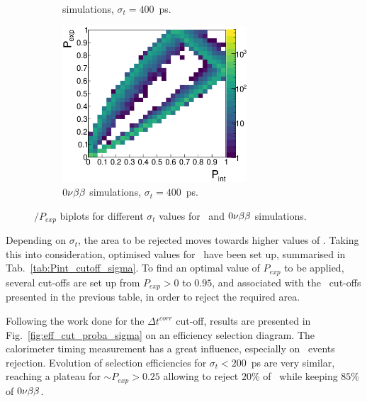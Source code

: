 \begin{figure}[!h]
\begin{subfigure}[t]{0.49\textwidth}
  \captionsetup{justification=justified}
  \caption{\Tl simulations, ${\sigma_{t}=400}$~ps.
    \label{subfig:}}
\end{subfigure}
\hfill
\begin{subfigure}[t]{0.49\textwidth}
  \centering
  \includegraphics[width=0.76\textwidth]{timedifference/fig_timediff/PintVSPexp_0nubb_400.eps}
  \captionsetup{justification=justified}
  \caption{$0\nu\beta\beta$ simulations, ${\sigma_{t}=400}$~ps.
    \label{subfig:}}
\end{subfigure}
\caption{\Pint$/P_{exp}$ biplots for different $\sigma_{t}$ values for \Tl\ and $0\nu\beta\beta$ simulations.
  \label{fig:biplot_Pexp_Pint_sigma}}
\end{figure}
Depending on $\sigma_{t}$, the area to be rejected moves towards higher values of \Pint.
Taking this into consideration, optimised values for \Pint\ have been set up, summarised in Tab.~\ref{tab:Pint_cutoff_sigma}.
To find an optimal value of $P_{exp}$ to be applied, several cut-offs are set up from $P_{exp}>0$ to $0.95$, and associated with the \Pint\ cut-offs presented in the previous table, in order to reject the required area.

Following the work done for the $\Delta t^{corr}$ cut-off, results are presented in Fig.~\ref{fig:eff_cut_proba_sigma} on an efficiency selection diagram.
The calorimeter timing measurement has a great influence, especially on \Tl\ events rejection.
Evolution of selection efficiencies for ${\sigma_{t}<200}$~ps are very similar, reaching a plateau for ${\sim P_{exp}>0.25}$ allowing to reject $20$\% of \Tl\ while keeping $85$\% of $0\nu\beta\beta$.

